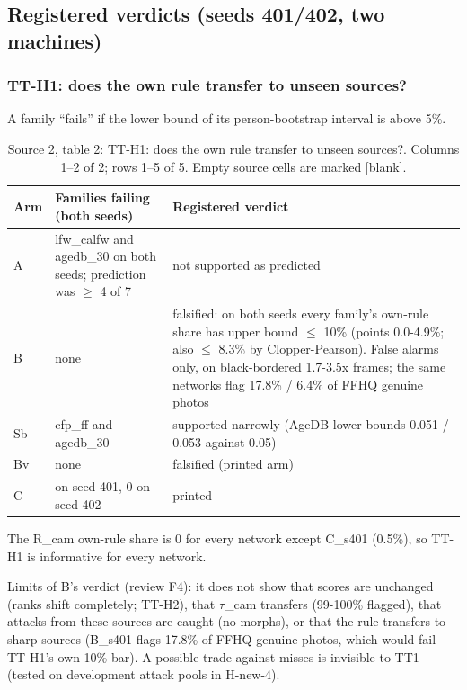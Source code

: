 \documentclass[10pt,twocolumn,letterpaper]{article}
\begin{document}
\subsection{Registered verdicts (seeds 401/402, two machines)}\label{registered-verdicts-seeds-401402-two-machines}

\subsubsection{TT-H1: does the own rule transfer to unseen sources?}\label{tt-h1-does-the-own-rule-transfer-to-unseen-sources}

A family ``fails'' if the lower bound of its person-bootstrap interval is above 5\%.

\begin{table}[p]
\centering\small
\caption{Source 2, table 2: TT-H1: does the own rule transfer to unseen sources?. Columns 1--2 of 2; rows 1--5 of 5. Empty source cells are marked {[}blank{]}.}
\label{tab:transfer-2.2.1.0}
\begin{tabularx}{\textwidth}{>{\raggedright\arraybackslash}p{}>{\raggedright\arraybackslash}X>{\raggedright\arraybackslash}X}
\toprule
Arm & Families failing (both seeds) & Registered verdict \\
\midrule
A & lfw\_calfw and agedb\_30 on both seeds; prediction was \(\ge\) 4 of 7 & not supported as predicted \\
B & none & falsified: on both seeds every family's own-rule share has upper bound \(\le\) 10\% (points 0.0-4.9\%; also \(\le\) 8.3\% by Clopper-Pearson). False alarms only, on black-bordered 1.7-3.5x frames; the same networks flag 17.8\% / 6.4\% of FFHQ genuine photos \\
Sb & cfp\_ff and agedb\_30 & supported narrowly (AgeDB lower bounds 0.051 / 0.053 against 0.05) \\
Bv & none & falsified (printed arm) \\
C & 4 on seed 401, 0 on seed 402 & printed \\
\bottomrule
\end{tabularx}
\end{table}


The R\_cam own-rule share is 0 for every network except C\_s401 (0.5\%), so TT-H1 is informative for every network.

Limits of B's verdict (review F4): it does not show that scores are unchanged (ranks shift completely; TT-H2), that \(\tau\)\_cam transfers (99-100\% flagged), that attacks from these sources are caught (no morphs), or that the rule transfers to sharp sources (B\_s401 flags 17.8\% of FFHQ genuine photos, which would fail TT-H1's own 10\% bar). A possible trade against misses is invisible to TT1 (tested on development attack pools in H-new-4).
\end{document}
